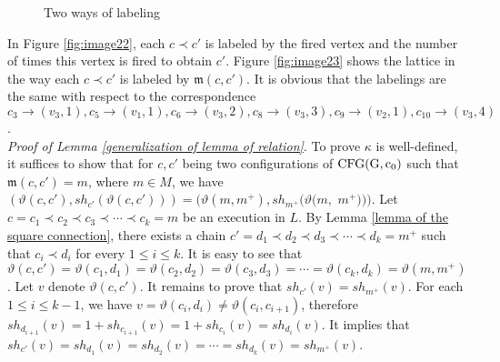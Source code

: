 \documentclass{article}
\theoremstyle{definition}
\newcommand\meetirrdiff[2]{\mathfrak{m}(#1,#2)}
\newcommand\shotvector[2]{sh_{#1}(#2)}
\begin{document}
\captionsetup[subfloat]{justification=centerfirst,singlelinecheck=false}
\begin{figure}[!h]
\centering
{}
\qquad \qquad
{}
\caption{Two ways of labeling}
\end{figure}
\captionsetup[subfloat]{justification=justified,singlelinecheck=true}In Figure \ref{fig:image22}, each $c\prec c'$ is labeled by the fired vertex and the number of times this vertex is fired to obtain $c'$. Figure \ref{fig:image23} shows the lattice in the way each $c\prec c'$ is labeled by $\meetirrdiff{c}{c'}$. It is obvious that the labelings are the same with respect to the correspondence $c_3\to (v_3,1),c_5 \to (v_1,1),c_6\to (v_3,2),c_8\to (v_3,3),c_9\to (v_2,1),c_{10}\to (v_3,4)$.\\

\noindent\emph{{Proof of Lemma \ref{generalization of lemma of relation}}}. To prove $\kappa$ is well-defined, it suffices to show that for $c,c'$ being two configurations of ${\rm CFG(G,c_0)}$ such that $\meetirrdiff{c}{c'}=m$, where $m\in M$, we have $(\vartheta(c,c'),\shotvector{c'}{\vartheta(c,c')})=(\vartheta(m,m^{+}),\shotvector{m^{+}}{\vartheta(m,$ \linebreak $m^{+})})$. Let $c=c_1\prec c_2\prec c_3\prec \cdots \prec c_k=m$ be an execution in $L$. By Lemma \ref{lemma of the square connection}, there exists a chain $c'=d_1\prec d_2\prec d_3\prec \cdots \prec d_k=m^{+}$ such that $c_i \prec d_i$ for every $1 \leq i \leq k$. It is easy to see that $\vartheta(c,c')=\vartheta(c_1,d_1)=\vartheta(c_2,d_2)=\vartheta(c_3,d_3)=\cdots=\vartheta(c_k,d_k)=\vartheta(m,m^{+})$. Let $v$ denote $\vartheta(c,c')$. It remains to prove that $\shotvector{c'}{v}=\shotvector{m^{+}}{v}$. For each $1\leq i\leq k-1$, we have $v=\vartheta(c_i,d_i)\neq \vartheta(c_i,c_{i+1})$, therefore $\shotvector{d_{i+1}}{v}=1+\shotvector{c_{i+1}}{v}=1+\shotvector{c_i}{v}=\shotvector{d_i}{v}$. It implies that $\shotvector{c'}{v}=\shotvector{d_1}{v}=\shotvector{d_2}{v}=\cdots=\shotvector{d_k}{v}=\shotvector{m^{+}}{v}$.
 
\end{document}
